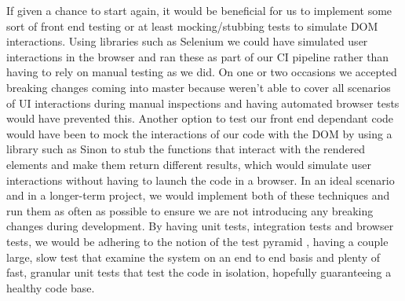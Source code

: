 \documentclass[a4paper]{report}
\begin{document}
	\par If given a chance to start again, it would be beneficial for us to implement some sort of front end testing or at least mocking/stubbing tests to simulate DOM interactions. Using libraries such as Selenium we could have simulated user interactions in the browser and ran these as part of our CI pipeline rather than having to rely on manual testing as we did. On one or two occasions we accepted breaking changes coming into master because weren't able to cover all scenarios of UI interactions during manual inspections and having automated browser tests would have prevented this. Another option to test our front end dependant code would have been to mock the interactions of our code with the DOM by using a library such as Sinon to stub the functions that interact with the rendered elements and make them return different results, which would simulate user interactions without having to launch the code in a browser. In an ideal scenario and in a longer-term project, we would implement both of these techniques and run them as often as possible to ensure we are not introducing any breaking changes during development. By having unit tests, integration tests and browser tests, we would be adhering to the notion of the test pyramid \cite{vocke_practical_2018}, having a couple large, slow test that examine the system on an end to end basis and plenty of fast, granular unit tests that test the code in isolation, hopefully guaranteeing a healthy code base.\newline
	
\end{document}
